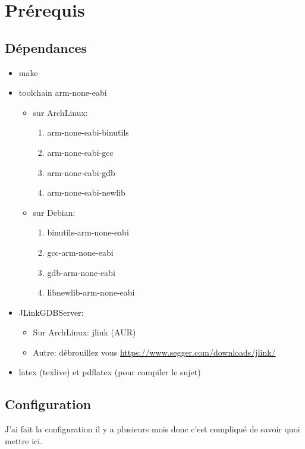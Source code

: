 \documentclass[a4paper,10pt]{article} %
\begin{document}
\section{Prérequis}
\subsection{\label{dependances}Dépendances}
\begin{itemize}[label=$\bullet$]
    \item make
    \item toolchain arm-none-eabi
    \begin{itemize}
        \item sur ArchLinux:
        \begin{enumerate}
            \item arm-none-eabi-binutils
            \item arm-none-eabi-gcc
            \item arm-none-eabi-gdb
            \item arm-none-eabi-newlib
        \end{enumerate}
        \item sur Debian:
        \begin{enumerate}
            \item binutils-arm-none-eabi
            \item gcc-arm-none-eabi
            \item gdb-arm-none-eabi
            \item libnewlib-arm-none-eabi
        \end{enumerate}
    \end{itemize}
    \item JLinkGDBServer:
    \begin{itemize}
        \item Sur ArchLinux: jlink (AUR)
        \item Autre: débrouillez vous \href{https://www.segger.com/downloads/jlink/#J-LinkSoftwareAndDocumentationPack}{https://www.segger.com/downloads/jlink/}
    \end{itemize}
    \item latex (texlive) et pdflatex (pour compiler le sujet)
\end{itemize}

\subsection{Configuration}
J'ai fait la configuration il y a plusieurs mois donc c'est compliqué de savoir quoi mettre ici.\\
\end{document}
